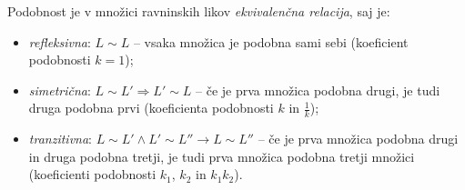             
            Podobnost je v množici ravninskih likov \textit{ekvivalenčna relacija}, saj je:
                \begin{itemize}
                    \item \textit{refleksivna}: $L\sim L$ -- vsaka množica je podobna sami sebi (koeficient podobnosti $k=1$);
                    \item \textit{simetrična}: $L\sim L' \Rightarrow L'\sim L$ -- če je prva množica podobna drugi, je tudi druga podobna prvi (koeficienta podobnosti $k$ in $\frac{1}{k}$);
                    \item \textit{tranzitivna}: $L\sim L' \land L'\sim L'' \rightarrow L\sim L''$ -- če je prva množica podobna drugi in druga podobna tretji, 
                            je tudi prva množica podobna tretji množici (koeficienti podobnosti $k_1$, $k_2$ in $k_1k_2$).
                \end{itemize}
            

        



